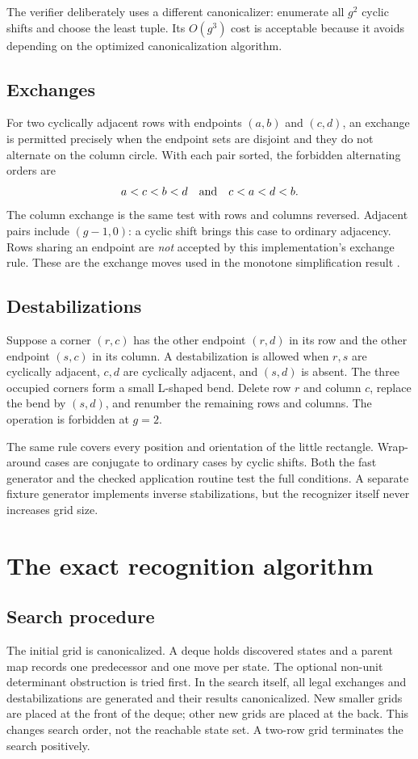 \documentclass[11pt]{article}
\begin{document}
The verifier deliberately uses a different canonicalizer: enumerate all $g^2$
cyclic shifts and choose the least tuple. Its $O(g^3)$ cost is acceptable because
it avoids depending on the optimized canonicalization algorithm.

\subsection{Exchanges}
For two cyclically adjacent rows with endpoints $(a,b)$ and $(c,d)$, an exchange
is permitted precisely when the endpoint sets are disjoint and they do not
alternate on the column circle. With each pair sorted, the forbidden alternating
orders are
\[
 a<c<b<d\quad\hbox{and}\quad c<a<d<b.
\]
The column exchange is the same test with rows and columns reversed. Adjacent
pairs include $(g-1,0)$: a cyclic shift brings this case to ordinary adjacency.
Rows sharing an endpoint are \emph{not} accepted by this implementation's
exchange rule. These are the exchange moves used in the monotone simplification
result \cite{dynnikov}.

\subsection{Destabilizations}
Suppose a corner $(r,c)$ has the other endpoint $(r,d)$ in its row and the other
endpoint $(s,c)$ in its column. A destabilization is allowed when $r,s$ are
cyclically adjacent, $c,d$ are cyclically adjacent, and $(s,d)$ is absent. The
three occupied corners form a small L-shaped bend. Delete row $r$ and column
$c$, replace the bend by $(s,d)$, and renumber the remaining rows and columns.
The operation is forbidden at $g=2$.

The same rule covers every position and orientation of the little rectangle.
Wrap-around cases are conjugate to ordinary cases by cyclic shifts. Both the
fast generator and the checked application routine test the full conditions.
A separate fixture generator implements inverse stabilizations, but the
recognizer itself never increases grid size.

\section{The exact recognition algorithm}
\subsection{Search procedure}
The initial grid is canonicalized. A deque holds discovered states and a
parent map records one predecessor and one move per state. The optional
non-unit determinant obstruction is tried first. In the search itself,
all legal exchanges and destabilizations are generated and their results
canonicalized. New smaller grids are placed at the front of the deque; other
new grids are placed at the back. This changes search order, not the reachable
state set. A two-row grid terminates the search positively.
\end{document}

